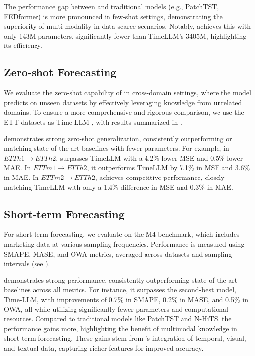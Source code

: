 The performance gap between \method and traditional models (e.g., PatchTST, FEDformer) is more pronounced in few-shot settings, demonstrating the superiority of multi-modality in data-scarce scenarios. Notably, \method achieves this with only 143M parameters, significantly fewer than TimeLLM's 3405M, highlighting its efficiency.

\subsection{Zero-shot Forecasting}

We evaluate the zero-shot capability of \method in cross-domain settings, where the model predicts on unseen datasets by effectively leveraging knowledge from unrelated domains. To ensure a more comprehensive and rigorous comparison, we use the ETT datasets as Time-LLM \cite{jin2023time}, with results summarized in .

\method demonstrates strong zero-shot generalization, consistently outperforming or matching state-of-the-art baselines with fewer parameters. For example, in $ETTh1 \rightarrow ETTh2$, \method surpasses TimeLLM with a 4.2\% lower MSE and 0.5\% lower MAE. In $ETTm1 \rightarrow ETTh2$, it outperforms TimeLLM by 7.1\% in MSE and 3.6\% in MAE. In $ETTm2 \rightarrow ETTh2$, \method achieves competitive performance, closely matching TimeLLM with only a 1.4\% difference in MSE and 0.3\% in MAE.

\subsection{Short-term Forecasting}

For short-term forecasting, we evaluate \method on the M4 benchmark, which includes marketing data at various sampling frequencies. Performance is measured using SMAPE, MASE, and OWA metrics, averaged across datasets and sampling intervals (see ).

\method demonstrates strong performance, consistently outperforming state-of-the-art baselines across all metrics. For instance, it surpasses the second-best model, Time-LLM, with improvements of 0.7\% in SMAPE, 0.2\% in MASE, and 0.5\% in OWA, all while utilizing significantly fewer parameters and computational resources. Compared to traditional models like PatchTST and N-HiTS, the performance gains more, highlighting the benefit of multimodal knowledge in short-term forecasting. These gains stem from \method's integration of temporal, visual, and textual data, capturing richer features for improved accuracy.

